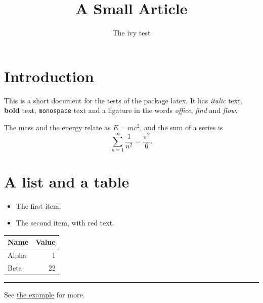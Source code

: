 \documentclass[letterpaper]{article}
\title{A Small Article}
\author{The ivy test}
\date{}
\begin{document}
\maketitle

\section{Introduction}
This is a short document for the tests of the package latex. It has
\emph{italic} text, \textbf{bold} text, \texttt{monospace} text and a
ligature in the words \emph{office}, \emph{find} and \emph{flow}.

The mass and the energy relate as $E = mc^2$, and the sum of a series is
\[
  \sum_{n=1}^{\infty} \frac{1}{n^2} = \frac{\pi^2}{6}.
\]

\section{A list and a table}
\begin{itemize}
  \item The first item.
  \item The second item, with {\color{red} red} text.
\end{itemize}

\begin{tabular}{|l|r|}
  \hline
  Name & Value \\
  \hline
  Alpha & 1 \\
  Beta  & 22 \\
  \hline
\end{tabular}

\noindent\rule{4cm}{0.4pt}

See \href{https://example.com}{the example} for more.
\end{document}
